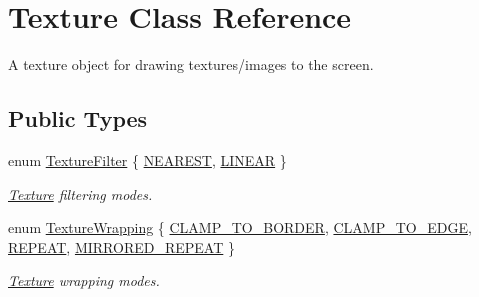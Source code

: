 \hypertarget{class_texture}{\section{Texture Class Reference}
\label{class_texture}
}


A texture object for drawing textures/images to the screen.  


\subsection*{Public Types}
\begin{DoxyCompactItemize}
\item 
enum \hyperlink{class_texture_ac4b92e6b8c820ded95490092f8bfff74}{Texture\+Filter} \{ \hyperlink{class_texture_ac4b92e6b8c820ded95490092f8bfff74a32bf899c26ebe34101c3c9d15e41b77e}{N\+E\+A\+R\+E\+S\+T}, 
\hyperlink{class_texture_ac4b92e6b8c820ded95490092f8bfff74adc101ebf31c49c2d4b80b7c6f59f22cb}{L\+I\+N\+E\+A\+R}
 \}
\begin{DoxyCompactList}\small\item\em \hyperlink{class_texture}{Texture} filtering modes. \end{DoxyCompactList}\item 
enum \hyperlink{class_texture_ab57ddfe4ab6794971da5963f80026824}{Texture\+Wrapping} \{ \hyperlink{class_texture_ab57ddfe4ab6794971da5963f80026824aecb0feeaaa8b95157dd29d1c77d0332e}{C\+L\+A\+M\+P\+\_\+\+T\+O\+\_\+\+B\+O\+R\+D\+E\+R}, 
\hyperlink{class_texture_ab57ddfe4ab6794971da5963f80026824ac017e952a3740f4b8ba06fae64e262df}{C\+L\+A\+M\+P\+\_\+\+T\+O\+\_\+\+E\+D\+G\+E}, 
\hyperlink{class_texture_ab57ddfe4ab6794971da5963f80026824a972f3df9d279a3d3acc88bcbe4452d51}{R\+E\+P\+E\+A\+T}, 
\hyperlink{class_texture_ab57ddfe4ab6794971da5963f80026824ac1b32fc83f123788b14f7b244b93cb30}{M\+I\+R\+R\+O\+R\+E\+D\+\_\+\+R\+E\+P\+E\+A\+T}
 \}
\begin{DoxyCompactList}\small\item\em \hyperlink{class_texture}{Texture} wrapping modes. \end{DoxyCompactList}\end{DoxyCompactItemize}
